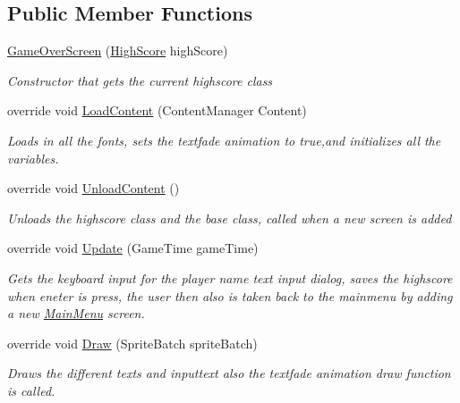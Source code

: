 \subsection*{Public Member Functions}
\begin{DoxyCompactItemize}
\item 
\hyperlink{class_pacman_1_1_game_over_screen_a7d97bf9092aecb4d9de8cd93e444f4f1}{Game\-Over\-Screen} (\hyperlink{class_pacman_1_1_high_score}{High\-Score} high\-Score)
\begin{DoxyCompactList}\small\item\em Constructor that gets the current highscore class \end{DoxyCompactList}\item 
override void \hyperlink{class_pacman_1_1_game_over_screen_a43eaf6170505796fcfb0bdb73560c744}{Load\-Content} (Content\-Manager Content)
\begin{DoxyCompactList}\small\item\em Loads in all the fonts, sets the textfade animation to true,and initializes all the variables. \end{DoxyCompactList}\item 
override void \hyperlink{class_pacman_1_1_game_over_screen_a70173a7767450e66a6deeb00bc4a5844}{Unload\-Content} ()
\begin{DoxyCompactList}\small\item\em Unloads the highscore class and the base class, called when a new screen is added \end{DoxyCompactList}\item 
override void \hyperlink{class_pacman_1_1_game_over_screen_abfdcd8b539aa5020bf9e34a86072ae81}{Update} (Game\-Time game\-Time)
\begin{DoxyCompactList}\small\item\em Gets the keyboard input for the player name text input dialog, saves the highscore when eneter is press, the user then also is taken back to the mainmenu by adding a new \hyperlink{class_pacman_1_1_main_menu}{Main\-Menu} screen. \end{DoxyCompactList}\item 
override void \hyperlink{class_pacman_1_1_game_over_screen_ae8e0cb7c8d8f836483c2e0e776e939ef}{Draw} (Sprite\-Batch sprite\-Batch)
\begin{DoxyCompactList}\small\item\em Draws the different texts and inputtext also the textfade animation draw function is called. \end{DoxyCompactList}\end{DoxyCompactItemize}
